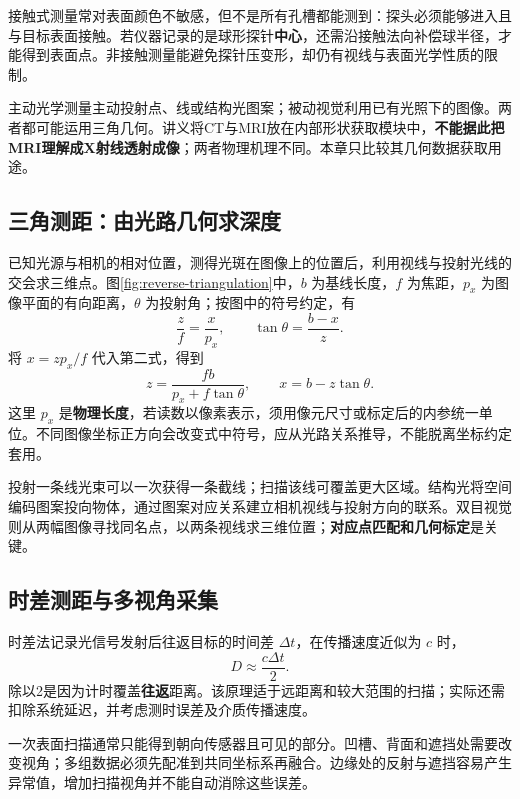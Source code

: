 接触式测量常对表面颜色不敏感，但不是所有孔槽都能测到：探头必须能够进入且与目标表面接触。若仪器记录的是球形探针\textbf{中心}，还需沿接触法向补偿球半径，才能得到表面点。非接触测量能避免探针压变形，却仍有视线与表面光学性质的限制。

主动光学测量主动投射点、线或结构光图案；被动视觉利用已有光照下的图像。两者都可能运用三角几何。讲义将CT与MRI放在内部形状获取模块中，\textbf{不能据此把MRI理解成X射线透射成像}；两者物理机理不同。本章只比较其几何数据获取用途。

\subsection{三角测距：由光路几何求深度}
已知光源与相机的相对位置，测得光斑在图像上的位置后，利用视线与投射光线的交会求三维点。图\ref{fig:reverse-triangulation}中，$b$ 为基线长度，$f$ 为焦距，$p_x$ 为图像平面的有向距离，$\theta$ 为投射角；按图中的符号约定，有
\[
\frac{z}{f}=\frac{x}{p_x},\qquad
\tan\theta=\frac{b-x}{z}.
\]
将 $x=zp_x/f$ 代入第二式，得到
\[
\boxed{z=\frac{fb}{p_x+f\tan\theta}},\qquad
x=b-z\tan\theta.
\]
这里 $p_x$ 是\textbf{物理长度}，若读数以像素表示，须用像元尺寸或标定后的内参统一单位。不同图像坐标正方向会改变式中符号，应从光路关系推导，不能脱离坐标约定套用。

投射一条线光束可以一次获得一条截线；扫描该线可覆盖更大区域。结构光将空间编码图案投向物体，通过图案对应关系建立相机视线与投射方向的联系。双目视觉则从两幅图像寻找同名点，以两条视线求三维位置；\textbf{对应点匹配和几何标定}是关键。


\subsection{时差测距与多视角采集}
时差法记录光信号发射后往返目标的时间差 $\Delta t$，在传播速度近似为 $c$ 时，
\[
\boxed{D\approx\frac{c\Delta t}{2}}.
\]
除以2是因为计时覆盖\textbf{往返}距离。该原理适于远距离和较大范围的扫描；实际还需扣除系统延迟，并考虑测时误差及介质传播速度。

一次表面扫描通常只能得到朝向传感器且可见的部分。凹槽、背面和遮挡处需要改变视角；多组数据必须先配准到共同坐标系再融合。边缘处的反射与遮挡容易产生异常值，增加扫描视角并不能自动消除这些误差。

